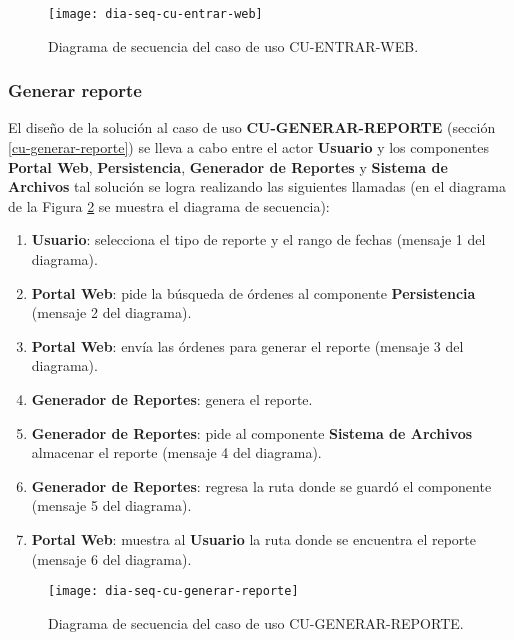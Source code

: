 \begin{figure}[h]
	\centering
	\texttt{[image: dia-seq-cu-entrar-web]}
	\caption{Diagrama de secuencia del caso de uso CU-ENTRAR-WEB.}
	\label{fig:dia-seq-cu-entrar-web}
\end{figure}

\subsubsection{Generar reporte}
El diseño de la solución al caso de uso \textbf{CU-GENERAR-REPORTE} (sección \ref{cu-generar-reporte}) se lleva a cabo entre el actor \textbf{Usuario} y los componentes \textbf{Portal Web}, \textbf{Persistencia}, \textbf{Generador de Reportes} y  \textbf{Sistema de Archivos} tal solución se logra realizando las siguientes llamadas (en el diagrama de la Figura \ref{fig:dia-seq-cu-generar-reporte} se muestra el diagrama de secuencia):
\begin{enumerate}
	\item \textbf{Usuario}: selecciona el tipo de reporte y el rango de fechas (mensaje 1 del diagrama).
	\item \textbf{Portal Web}: pide la búsqueda de órdenes al componente \textbf{Persistencia} (mensaje 2 del diagrama).
	\item \textbf{Portal Web}: envía las órdenes para generar el reporte (mensaje 3 del diagrama).
	\item \textbf{Generador de Reportes}: genera el reporte.
	\item \textbf{Generador de Reportes}: pide al componente \textbf{Sistema de Archivos} almacenar el reporte (mensaje 4 del diagrama).
	\item \textbf{Generador de Reportes}: regresa la ruta donde se guardó el componente (mensaje 5 del diagrama).
	\item \textbf{Portal Web}: muestra al \textbf{Usuario} la ruta donde se encuentra el reporte (mensaje 6 del diagrama).
\end{enumerate}

\begin{figure}[h]
	\centering
	\texttt{[image: dia-seq-cu-generar-reporte]}
	\caption{Diagrama de secuencia del caso de uso CU-GENERAR-REPORTE.}
	\label{fig:dia-seq-cu-generar-reporte}
\end{figure}

